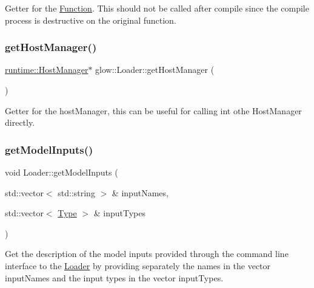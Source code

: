 Getter for the \hyperlink{classglow_1_1_function}{Function}. This should not be called after compile since the compile process is destructive on the original function. \mbox{\label{classglow_1_1_loader_a8c264157d286f806b93c09d08a06d004}} 
\subsubsection{\texorpdfstring{get\+Host\+Manager()}{getHostManager()}}
{\footnotesize\ttfamily \hyperlink{classglow_1_1runtime_1_1_host_manager}{runtime\+::\+Host\+Manager}$\ast$ glow\+::\+Loader\+::get\+Host\+Manager (\begin{DoxyParamCaption}{ }\end{DoxyParamCaption})\hspace{0.3cm}{\ttfamily [inline]}}

Getter for the host\+Manager, this can be useful for calling int othe Host\+Manager directly. \mbox{\label{classglow_1_1_loader_ae2b9d671348ef892b4a752988414b39f}} 
\subsubsection{\texorpdfstring{get\+Model\+Inputs()}{getModelInputs()}}
{\footnotesize\ttfamily void Loader\+::get\+Model\+Inputs (\begin{DoxyParamCaption}\item[{std\+::vector$<$ std\+::string $>$ \&}]{input\+Names,  }\item[{std\+::vector$<$ \hyperlink{structglow_1_1_type}{Type} $>$ \&}]{input\+Types }\end{DoxyParamCaption})\hspace{0.3cm}{\ttfamily [static]}}

Get the description of the model inputs provided through the command line interface to the \hyperlink{classglow_1_1_loader}{Loader} by providing separately the names in the vector {\ttfamily input\+Names} and the input types in the vector {\ttfamily input\+Types}.

